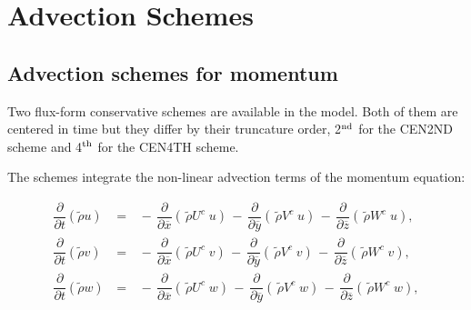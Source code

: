 %
%

\chapter{Advection Schemes}
\minitoc

\section{Advection schemes for momentum}

Two flux-form conservative schemes are available in the model. Both of them are centered in time but they differ by their truncature order, 2$^{\rm nd}$ for the CEN2ND scheme and 4$^{\rm th}$ for the CEN4TH scheme.

The schemes integrate the non-linear advection terms of the momentum equation:

\begin{eqnarray}
\label{condm}
\dfrac{\partial}{\partial t}(\tilde{\rho}u) \, &=&
 \, - \, \dfrac{\partial }{\partial \overline{x}} (\,\tilde{\rho} U^{c} \; u)
 \, - \, \dfrac{\partial }{\partial \overline{y}} (\,\tilde{\rho} V^{c} \; u)
 \, - \, \dfrac{\partial }{\partial \overline{z}} (\,\tilde{\rho} W^{c} \; u),\\
\dfrac{\partial}{\partial t}(\tilde{\rho}v) \, &=&
 \, - \, \dfrac{\partial }{\partial \overline{x}} (\,\tilde{\rho} U^{c} \; v)
 \, - \, \dfrac{\partial }{\partial \overline{y}} (\,\tilde{\rho} V^{c} \; v)
 \, - \, \dfrac{\partial }{\partial \overline{z}} (\,\tilde{\rho} W^{c} \; v),\\
\dfrac{\partial}{\partial t}(\tilde{\rho}w) \, &=&
 \, - \, \dfrac{\partial }{\partial \overline{x}} (\,\tilde{\rho} U^{c} \; w)
 \, - \, \dfrac{\partial }{\partial \overline{y}} (\,\tilde{\rho} V^{c} \; w)
 \, - \, \dfrac{\partial }{\partial \overline{z}} (\,\tilde{\rho} W^{c} \; w),
\end{eqnarray}

